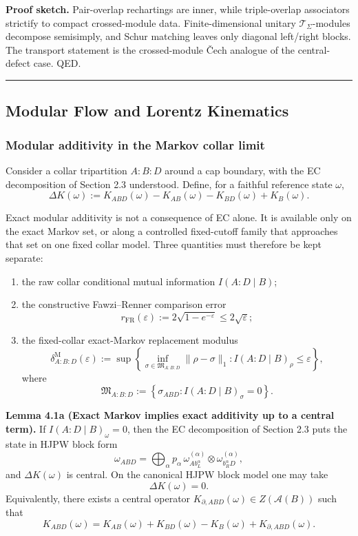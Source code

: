 \textbf{Proof sketch.} Pair-overlap rechartings are inner, while triple-overlap associators strictify to compact crossed-module data. Finite-dimensional unitary \(\mathcal T_\Sigma\)-modules decompose semisimply, and Schur matching leaves only diagonal left/right blocks. The transport statement is the crossed-module \v{C}ech analogue of the central-defect case. QED.

\begin{center}\rule{0.5\linewidth}{0.5pt}\end{center}
\subsection{Modular Flow and Lorentz Kinematics}\label{4-modular-flow-and-lorentz-kinematics}

\subsubsection{Modular additivity in the Markov collar limit}\label{41-modular-additivity-in-the-markov-collar-limit}

Consider a collar tripartition \(A:B:D\) around a cap boundary, with the EC decomposition of Section 2.3 understood. Define, for a faithful reference state \(\omega\),
\[
\Delta K(\omega)
:=
K_{ABD}(\omega)-K_{AB}(\omega)-K_{BD}(\omega)+K_B(\omega).
\]

Exact modular additivity is not a consequence of EC alone. It is available only on the exact Markov set, or along a controlled fixed-cutoff family that approaches that set on one fixed collar model. Three quantities must therefore be kept separate:
\begin{enumerate}
\item the raw collar conditional mutual information \(I(A:D\mid B)\);
\item the constructive Fawzi--Renner comparison error
\[
r_{\mathrm{FR}}(\varepsilon):=
2\sqrt{1-e^{-\varepsilon}}
\le
2\sqrt{\varepsilon};
\]
\item the fixed-collar exact-Markov replacement modulus
\[
\delta^{\mathrm M}_{A:B:D}(\varepsilon)
:=
\sup\left\{
\inf_{\sigma\in\mathfrak M_{A:B:D}}\|\rho-\sigma\|_1:
I(A:D\mid B)_\rho\le \varepsilon
\right\},
\]
where
\[
\mathfrak M_{A:B:D}
:=
\left\{
\sigma_{ABD}: I(A:D\mid B)_\sigma=0
\right\}.
\]
\end{enumerate}

\textbf{Lemma 4.1a (Exact Markov implies exact additivity up to a central term).} If \(I(A:D \mid B)_\omega = 0\), then the EC decomposition of Section 2.3 puts the state in HJPW block form
\[
\omega_{ABD}
=
\bigoplus_{\alpha}
p_{\alpha}\,
\omega^{(\alpha)}_{A b_L^{\alpha}}
\otimes
\omega^{(\alpha)}_{b_R^{\alpha} D},
\]
and \(\Delta K(\omega)\) is central. On the canonical HJPW block model one may take
\[
\Delta K(\omega)=0.
\]
Equivalently, there exists a central operator \(K_{\partial,ABD}(\omega)\in Z(\mathcal A(B))\) such that
\[
K_{ABD}(\omega)
=
K_{AB}(\omega)+K_{BD}(\omega)-K_B(\omega)+K_{\partial,ABD}(\omega).
\]


